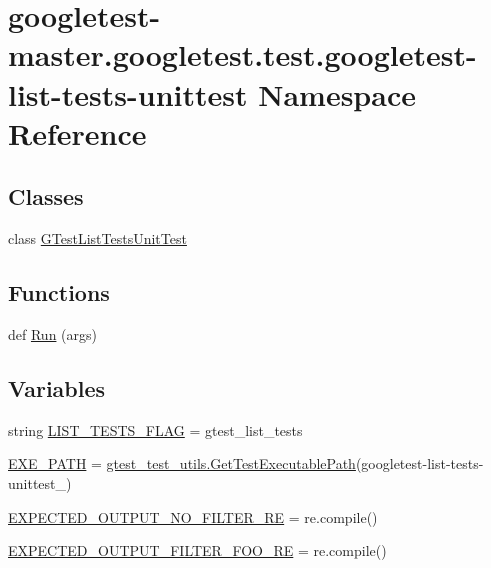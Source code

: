 \hypertarget{namespacegoogletest-master_1_1googletest_1_1test_1_1googletest-list-tests-unittest}{}\section{googletest-\/master.googletest.\+test.\+googletest-\/list-\/tests-\/unittest Namespace Reference}
\label{namespacegoogletest-master_1_1googletest_1_1test_1_1googletest-list-tests-unittest}
\subsection*{Classes}
\begin{DoxyCompactItemize}
\item 
class \mbox{\hyperlink{classgoogletest-master_1_1googletest_1_1test_1_1googletest-list-tests-unittest_1_1_g_test_list_tests_unit_test}{G\+Test\+List\+Tests\+Unit\+Test}}
\end{DoxyCompactItemize}
\subsection*{Functions}
\begin{DoxyCompactItemize}
\item 
def \mbox{\hyperlink{namespacegoogletest-master_1_1googletest_1_1test_1_1googletest-list-tests-unittest_ac6c4ea0539f01de4f53cadb187c724f4}{Run}} (args)
\end{DoxyCompactItemize}
\subsection*{Variables}
\begin{DoxyCompactItemize}
\item 
string \mbox{\hyperlink{namespacegoogletest-master_1_1googletest_1_1test_1_1googletest-list-tests-unittest_a1fc50bb80c982c875ae47d93a09f6c6c}{L\+I\+S\+T\+\_\+\+T\+E\+S\+T\+S\+\_\+\+F\+L\+AG}} = \textquotesingle{}gtest\+\_\+list\+\_\+tests\textquotesingle{}
\item 
\mbox{\hyperlink{namespacegoogletest-master_1_1googletest_1_1test_1_1googletest-list-tests-unittest_a578d4b43336c63ddfe7372fabbf0beec}{E\+X\+E\+\_\+\+P\+A\+TH}} = \mbox{\hyperlink{namespacegoogletest-master_1_1googletest_1_1test_1_1gtest__test__utils_a78bbc69ac699e750a6a29188caa643c4}{gtest\+\_\+test\+\_\+utils.\+Get\+Test\+Executable\+Path}}(\textquotesingle{}googletest-\/list-\/tests-\/unittest\+\_\+\textquotesingle{})
\item 
\mbox{\hyperlink{namespacegoogletest-master_1_1googletest_1_1test_1_1googletest-list-tests-unittest_a1ea7524467c274ebb1f57890e68319ad}{E\+X\+P\+E\+C\+T\+E\+D\+\_\+\+O\+U\+T\+P\+U\+T\+\_\+\+N\+O\+\_\+\+F\+I\+L\+T\+E\+R\+\_\+\+RE}} = re.\+compile()
\item 
\mbox{\hyperlink{namespacegoogletest-master_1_1googletest_1_1test_1_1googletest-list-tests-unittest_a3e140519b8553ab7de9052c1b35491af}{E\+X\+P\+E\+C\+T\+E\+D\+\_\+\+O\+U\+T\+P\+U\+T\+\_\+\+F\+I\+L\+T\+E\+R\+\_\+\+F\+O\+O\+\_\+\+RE}} = re.\+compile()
\end{DoxyCompactItemize}


